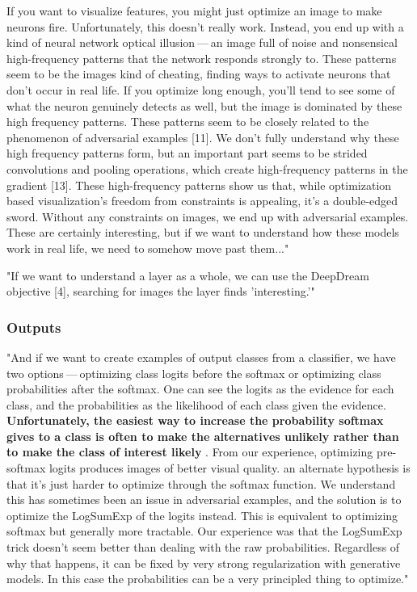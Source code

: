 \documentclass[]{scrartcl}
\begin{document}
If you want to visualize features, you might just optimize an image to make neurons ﬁre. Unfortunately, this doesn’t really work. Instead, you end up with a kind of neural network optical illusion — an image full of noise and nonsensical high-frequency patterns that the network responds strongly to. These patterns seem to be the images kind of cheating, ﬁnding ways to activate neurons that don’t occur in real life. If you optimize long enough, you’ll tend to see some of what the neuron genuinely detects as well, but the image is dominated by these high frequency patterns. These patterns seem to be closely related to the phenomenon of adversarial examples [11]. We don’t fully understand why these high frequency patterns form, but an important part seems to be strided convolutions and pooling operations, which create high-frequency patterns in the gradient [13]. These high-frequency patterns show us that, while optimization based visualization’s freedom from constraints is appealing, it’s a double-edged sword. Without any constraints on images, we end up with adversarial examples. These are certainly interesting, but if we want to understand how these models work in real life, we need to somehow move past them..." \cite{Olah2017}

"If we want to understand a layer as a whole, we can use the DeepDream objective [4], searching for images the layer finds 'interesting.'" \cite{Olah2017}
\subsubsection{Outputs}
"And if we want to create examples of output classes from a classiﬁer, we have two options --- optimizing class logits before the softmax or optimizing class probabilities after the softmax. One can see the logits as the evidence for each class, and the probabilities as the likelihood of each class given the evidence. \textbf{Unfortunately, the easiest way to increase the probability softmax gives to a class is often to make the alternatives unlikely rather than to make the class of interest likely} \cite{Simonyan2014}. From our experience, optimizing pre-softmax logits produces images of better visual quality. an alternate hypothesis is that it’s just harder to optimize through the softmax function. We understand this has sometimes been an issue in adversarial examples, and the solution is to optimize the LogSumExp of the logits instead. This is equivalent to optimizing softmax but generally more tractable. Our experience was that the LogSumExp trick doesn’t seem better than dealing with the raw probabilities. Regardless of why that happens, it can be fixed by very strong regularization with generative models. In this case the probabilities can be a very principled thing to optimize." \cite{Olah2017}
\end{document}
